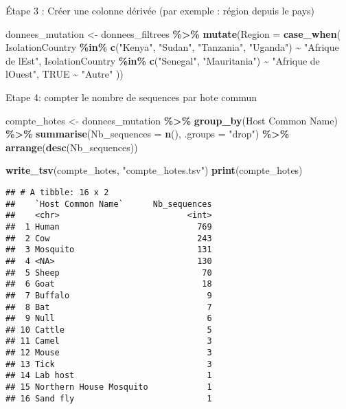 \documentclass[
]{article}
\newenvironment{Shaded}{\begin{snugshade}}{\end{snugshade}}
\newcommand{\AttributeTok}[1]{\textcolor[rgb]{0.13,0.29,0.53}{#1}}
\newcommand{\ConstantTok}[1]{\textcolor[rgb]{0.56,0.35,0.01}{#1}}
\newcommand{\FunctionTok}[1]{\textcolor[rgb]{0.13,0.29,0.53}{\textbf{#1}}}
\newcommand{\NormalTok}[1]{#1}
\newcommand{\OtherTok}[1]{\textcolor[rgb]{0.56,0.35,0.01}{#1}}
\newcommand{\SpecialCharTok}[1]{\textcolor[rgb]{0.81,0.36,0.00}{\textbf{#1}}}
\newcommand{\StringTok}[1]{\textcolor[rgb]{0.31,0.60,0.02}{#1}}
\begin{document}
Étape 3 : Créer une colonne dérivée (par exemple : région depuis le
pays)

\begin{Shaded}
\begin{Highlighting}[]
\NormalTok{donnees\_mutation }\OtherTok{\textless{}{-}}\NormalTok{ donnees\_filtrees }\SpecialCharTok{\%\textgreater{}\%}
  \FunctionTok{mutate}\NormalTok{(}\AttributeTok{Region =} \FunctionTok{case\_when}\NormalTok{(}
\NormalTok{    IsolationCountry }\SpecialCharTok{\%in\%} \FunctionTok{c}\NormalTok{(}\StringTok{"Kenya"}\NormalTok{, }\StringTok{"Sudan"}\NormalTok{, }\StringTok{"Tanzania"}\NormalTok{, }\StringTok{"Uganda"}\NormalTok{) }\SpecialCharTok{\textasciitilde{}} \StringTok{"Afrique de l\textquotesingle{}Est"}\NormalTok{,}
\NormalTok{    IsolationCountry }\SpecialCharTok{\%in\%} \FunctionTok{c}\NormalTok{(}\StringTok{"Senegal"}\NormalTok{, }\StringTok{"Mauritania"}\NormalTok{) }\SpecialCharTok{\textasciitilde{}} \StringTok{"Afrique de l\textquotesingle{}Ouest"}\NormalTok{,}
    \ConstantTok{TRUE} \SpecialCharTok{\textasciitilde{}} \StringTok{"Autre"}
\NormalTok{  ))}
\end{Highlighting}
\end{Shaded}

Etape 4: compter le nombre de sequences par hote commun

\begin{Shaded}
\begin{Highlighting}[]
\NormalTok{compte\_hotes }\OtherTok{\textless{}{-}}\NormalTok{ donnees\_mutation }\SpecialCharTok{\%\textgreater{}\%}
  \FunctionTok{group\_by}\NormalTok{(}\StringTok{\textasciigrave{}}\AttributeTok{Host Common Name}\StringTok{\textasciigrave{}}\NormalTok{) }\SpecialCharTok{\%\textgreater{}\%}
  \FunctionTok{summarise}\NormalTok{(}\AttributeTok{Nb\_sequences =} \FunctionTok{n}\NormalTok{(), }\AttributeTok{.groups =} \StringTok{"drop"}\NormalTok{) }\SpecialCharTok{\%\textgreater{}\%}
  \FunctionTok{arrange}\NormalTok{(}\FunctionTok{desc}\NormalTok{(Nb\_sequences))}

\FunctionTok{write\_tsv}\NormalTok{(compte\_hotes, }\StringTok{"compte\_hotes.tsv"}\NormalTok{)}
\FunctionTok{print}\NormalTok{(compte\_hotes)}
\end{Highlighting}
\end{Shaded}

\begin{verbatim}
## # A tibble: 16 x 2
##    `Host Common Name`      Nb_sequences
##    <chr>                          <int>
##  1 Human                            769
##  2 Cow                              243
##  3 Mosquito                         131
##  4 <NA>                             130
##  5 Sheep                             70
##  6 Goat                              18
##  7 Buffalo                            9
##  8 Bat                                7
##  9 Null                               6
## 10 Cattle                             5
## 11 Camel                              3
## 12 Mouse                              3
## 13 Tick                               3
## 14 Lab host                           1
## 15 Northern House Mosquito            1
## 16 Sand fly                           1
\end{verbatim}
\end{document}
